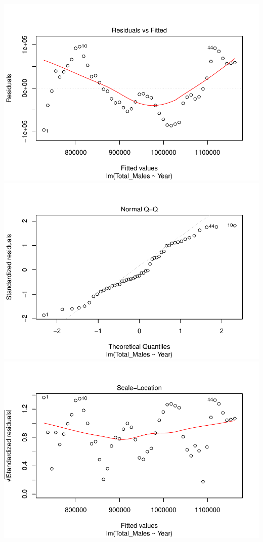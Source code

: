 \documentclass[]{article}
\begin{document}
\includegraphics{Assignment_5_Markdown_files/figure-latex/unnamed-chunk-4-1.pdf}
\includegraphics{Assignment_5_Markdown_files/figure-latex/unnamed-chunk-4-2.pdf}
\includegraphics{Assignment_5_Markdown_files/figure-latex/unnamed-chunk-4-3.pdf}
\end{document}
